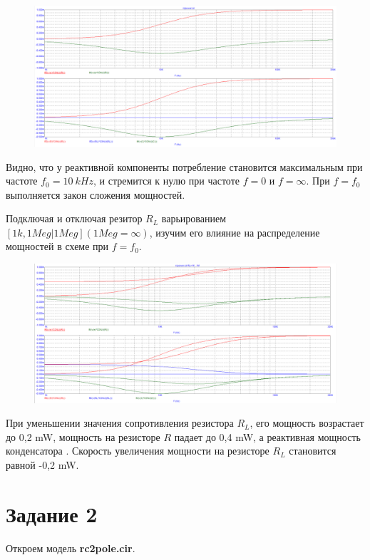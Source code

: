 \documentclass{article}
\begin{document}
\begin{figure}[H]
\centering
\includegraphics[scale=0.4]{rcpower_AC1.png}
\label{fig:Image1}
\end{figure}

Видно, что у реактивной компоненты потребление становится максимальным при частоте $f_0 = 10 \: kHz$, и стремится к нулю при частоте $f = 0$ и $f = \infty$. При $f = f_0$ выполняется закон сложения мощностей.

Подключая и отключая резитор $R_L$ варьированием $[1k, 1Meg \vert 1Meg] (1Meg = \infty)$, изучим его влияние на распределение мощностей в схеме при $f = f_0$.

\begin{figure}[H]
\centering
\includegraphics[scale=0.4]{rcpower_AC2.png}
\label{fig:Image1}
\end{figure}

При уменьшении значения сопротивления резистора $R_L$, его мощность возрастает до 0,2 mW, мощность на резисторе $R$ падает до 0,4 mW, а реактивная мощность конденсатора . Скорость увеличения мощности на резисторе $R_L$ становится равной -0,2 mW.

\section{Задание 2}
Откроем модель \textbf{rc2pole.cir}. 
\end{document}
